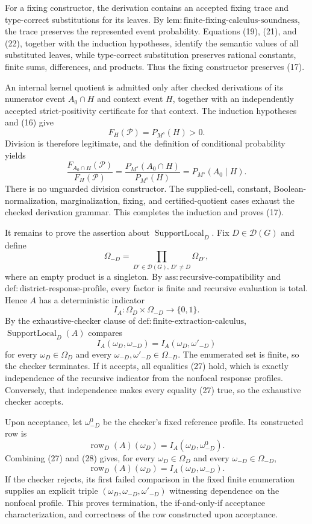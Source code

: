 For a fixing constructor, the derivation contains an accepted fixing trace and type-correct substitutions for its leaves. By \(\mathrm{lem:finite\text{-}fixing\text{-}calculus\text{-}soundness}\), the trace preserves the represented event probability. Equations (19), (21), and (22), together with the induction hypotheses, identify the semantic values of all substituted leaves, while type-correct substitution preserves rational constants, finite sums, differences, and products. Thus the fixing constructor preserves (17).

An internal kernel quotient is admitted only after checked derivations of its numerator event \(A_0\cap H\) and context event \(H\), together with an independently accepted strict-positivity certificate for that context. The induction hypotheses and (16) give
\[
 F_H(\mathcal P)=P_{M^s}(H)>0.
\tag{23}
\]
Division is therefore legitimate, and the definition of conditional probability yields
\[
 \frac{F_{A_0\cap H}(\mathcal P)}{F_H(\mathcal P)}
 =\frac{P_{M^s}(A_0\cap H)}{P_{M^s}(H)}
 =P_{M^s}(A_0\mid H).
\tag{24}
\]
There is no unguarded division constructor. The supplied-cell, constant, Boolean-normalization, marginalization, fixing, and certified-quotient cases exhaust the checked derivation grammar. This completes the induction and proves (17).

It remains to prove the assertion about \(\operatorname{SupportLocal}_D\). Fix \(D\in\mathcal D(G)\) and define
\[
 \Omega_{-D}
 =\prod_{D'\in\mathcal D(G),\,D'\ne D}\Omega_{D'},
\tag{25}
\]
where an empty product is a singleton. By \(\mathrm{ass:recursive\text{-}compatibility}\) and \(\mathrm{def:district\text{-}response\text{-}profile}\), every factor is finite and recursive evaluation is total. Hence \(A\) has a deterministic indicator
\[
 I_A:\Omega_D\times\Omega_{-D}\longrightarrow\{0,1\}.
\tag{26}
\]
By the exhaustive-checker clause of \(\mathrm{def:finite\text{-}extraction\text{-}calculus}\), \(\operatorname{SupportLocal}_D(A)\) compares
\[
 I_A(\omega_D,\omega_{-D})
 =I_A(\omega_D,\omega'_{-D})
\tag{27}
\]
for every \(\omega_D\in\Omega_D\) and every \(\omega_{-D},\omega'_{-D}\in\Omega_{-D}\). The enumerated set is finite, so the checker terminates. If it accepts, all equalities (27) hold, which is exactly independence of the recursive indicator from the nonfocal response profiles. Conversely, that independence makes every equality (27) true, so the exhaustive checker accepts.

Upon acceptance, let \(\omega_{-D}^{0}\) be the checker's fixed reference profile. Its constructed row is
\[
 \operatorname{row}_D(A)(\omega_D)
 =I_A(\omega_D,\omega_{-D}^{0}).
\tag{28}
\]
Combining (27) and (28) gives, for every \(\omega_D\in\Omega_D\) and every \(\omega_{-D}\in\Omega_{-D}\),
\[
 \operatorname{row}_D(A)(\omega_D)
 =I_A(\omega_D,\omega_{-D}).
\]
If the checker rejects, its first failed comparison in the fixed finite enumeration supplies an explicit triple \((\omega_D,\omega_{-D},\omega'_{-D})\) witnessing dependence on the nonfocal profile. This proves termination, the if-and-only-if acceptance characterization, and correctness of the row constructed upon acceptance.